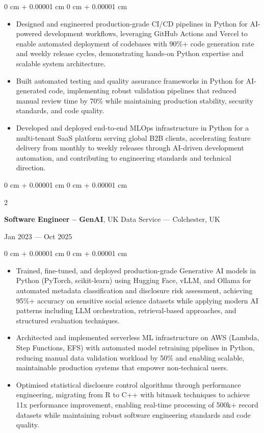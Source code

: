 \documentclass[6pt, letterpaper]{article}
\newenvironment{highlights}{
    \begin{itemize}[
        topsep=0.03 cm,
        parsep=0.03 cm,
        partopsep=0pt,
        itemsep=0pt,
        leftmargin=0 cm + 10pt
    ]
}{
    \end{itemize}
} %
\newenvironment{onecolentry}{
    \begin{adjustwidth}{
        0 cm + 0.00001 cm
    }{
        0 cm + 0.00001 cm
    }
}{
    \end{adjustwidth}
} %
\newenvironment{twocolentry}[2][]{
    \onecolentry
    \def\secondColumn{#2}
    \setcolumnwidth{\fill, 4.5 cm}
    \begin{paracol}{2}
}{
    \switchcolumn \raggedleft \secondColumn
    \end{paracol}
    \endonecolentry
} %
\begin{document}
        \begin{onecolentry}
        \begin{highlights}
            \item Designed and engineered production-grade CI/CD pipelines in Python for AI-powered development workflows, leveraging GitHub Actions and Vercel to enable automated deployment of codebases with 90\%+ code generation rate and weekly release cycles, demonstrating hands-on Python expertise and scalable system architecture.
            \item Built automated testing and quality assurance frameworks in Python for AI-generated code, implementing robust validation pipelines that reduced manual review time by 70\% while maintaining production stability, security standards, and code quality.
            \item Developed and deployed end-to-end MLOps infrastructure in Python for a multi-tenant SaaS platform serving global B2B clients, accelerating feature delivery from monthly to weekly releases through AI-driven development automation, and contributing to engineering standards and technical direction.
        \end{highlights}
        \end{onecolentry}

        \begin{twocolentry}{Jan 2023 --- Oct 2025}
        \textbf{Software Engineer – GenAI}, UK Data Service --- Colchester, UK
        \end{twocolentry}

        \begin{onecolentry}
        \begin{highlights}

            \item Trained, fine-tuned, and deployed production-grade Generative AI models in Python (PyTorch, scikit-learn) using Hugging Face, vLLM, and Ollama for automated metadata classification and disclosure risk assessment, achieving 95\%+ accuracy on sensitive social science datasets while applying modern AI patterns including LLM orchestration, retrieval-based approaches, and structured evaluation techniques.
            \item Architected and implemented serverless ML infrastructure on AWS (Lambda, Step Functions, EFS) with automated model retraining pipelines in Python, reducing manual data validation workload by 50\% and enabling scalable, maintainable production systems that empower non-technical users.
            \item Optimised statistical disclosure control algorithms through performance engineering, migrating from R to C++ with bitmask techniques to achieve 11x performance improvement, enabling real-time processing of 500k+ record datasets while maintaining robust software engineering standards and code quality.
        \end{highlights}
        \end{onecolentry}
\end{document}

